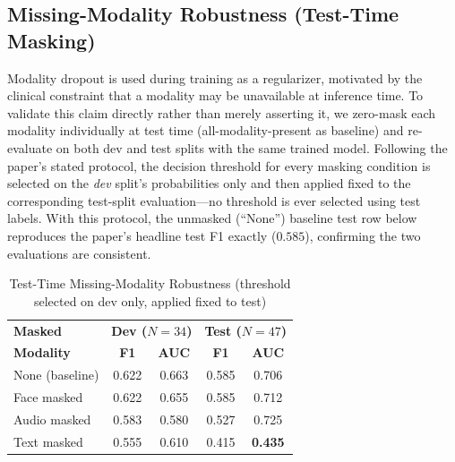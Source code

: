 \documentclass[journal]{IEEEtran}
\begin{document}
\subsection{Missing-Modality Robustness (Test-Time Masking)}
\label{sec:robustness}

Modality dropout is used during training as a regularizer, motivated
by the clinical constraint that a modality may be unavailable at
inference time. To validate this claim directly rather than merely
asserting it, we zero-mask each modality individually at test time
(all-modality-present as baseline) and re-evaluate on both dev and
test splits with the same trained model. Following the paper's stated
protocol, the decision threshold for every masking condition is
selected on the \emph{dev} split's probabilities only and then applied
fixed to the corresponding test-split evaluation---no threshold is
ever selected using test labels. With this protocol, the unmasked
(``None'') baseline test row below reproduces the paper's headline
test F1 exactly ($0.585$), confirming the two evaluations are
consistent.

\begin{table}[t]
\centering
\renewcommand{\arraystretch}{1.15}
\caption{Test-Time Missing-Modality Robustness (threshold selected on
dev only, applied fixed to test)}
\label{tab:robustness}
\begin{tabular}{lcccc}
\toprule
\textbf{Masked} & \multicolumn{2}{c}{\textbf{Dev ($N{=}34$)}}
  & \multicolumn{2}{c}{\textbf{Test ($N{=}47$)}} \\
\textbf{Modality} & \textbf{F1} & \textbf{AUC} & \textbf{F1} & \textbf{AUC} \\
\midrule
None (baseline)  & 0.622 & 0.663 & 0.585 & 0.706 \\
Face masked      & 0.622 & 0.655 & 0.585 & 0.712 \\
Audio masked     & 0.583 & 0.580 & 0.527 & 0.725 \\
Text masked      & 0.555 & 0.610 & 0.415 & \textbf{0.435} \\
\bottomrule
\end{tabular}
\end{table}
\end{document}
